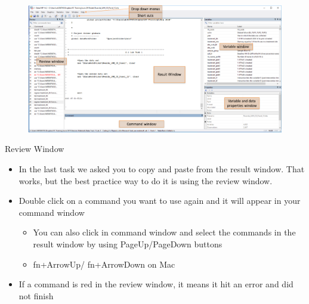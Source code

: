 \documentclass[aspectratio=169]{beamer}
\begin{document}
\begin{frame}{}
	\begin{figure}
		\centering
		\includegraphics[width=\linewidth]{img/window_des}
	\end{figure}
\end{frame}

\begin{frame}{Review Window}

\begin{itemize}
	\item In the last task we asked you to copy and paste from the result window. That works, but the best practice way to do it is using the review window.

	\item Double click on a command you want to use again and it will appear in your command window
	\begin{itemize}
		\item You can also click in command window and select the commands in the result window by using PageUp/PageDown buttons
		\item fn+ArrowUp/ fn+ArrowDown on Mac
	\end{itemize}
	\item If a command is red in the review window, it means it hit an error and did not finish
\end{itemize}
\end{frame}
\end{document}
